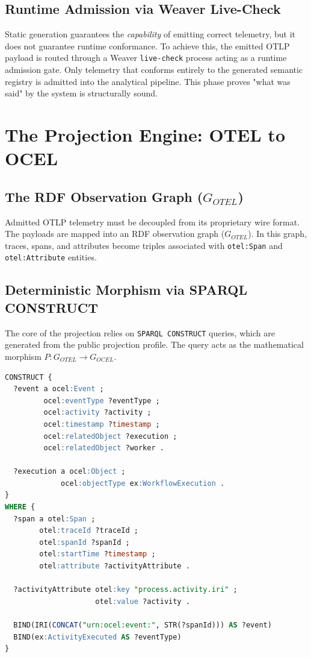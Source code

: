 \documentclass[12pt,a4paper,oneside]{book}
\begin{document}
\section{Runtime Admission via Weaver Live-Check}
Static generation guarantees the \textit{capability} of emitting correct telemetry, but it does not guarantee runtime conformance. To achieve this, the emitted OTLP payload is routed through a Weaver \texttt{live-check} process acting as a runtime admission gate. Only telemetry that conforms entirely to the generated semantic registry is admitted into the analytical pipeline. This phase proves "what was said" by the system is structurally sound.

\chapter{The Projection Engine: OTEL to OCEL}

\section{The RDF Observation Graph ($G_{OTEL}$)}
Admitted OTLP telemetry must be decoupled from its proprietary wire format. The payloads are mapped into an RDF observation graph ($G_{OTEL}$). In this graph, traces, spans, and attributes become triples associated with \texttt{otel:Span} and \texttt{otel:Attribute} entities.

\section{Deterministic Morphism via SPARQL CONSTRUCT}
The core of the projection relies on \texttt{SPARQL CONSTRUCT} queries, which are generated from the public projection profile. The query acts as the mathematical morphism $P: G_{OTEL} \to G_{OCEL}$.

\begin{lstlisting}[language=SQL, caption=Conceptual SPARQL Projection Query]
CONSTRUCT {
  ?event a ocel:Event ;
         ocel:eventType ?eventType ;
         ocel:activity ?activity ;
         ocel:timestamp ?timestamp ;
         ocel:relatedObject ?execution ;
         ocel:relatedObject ?worker .

  ?execution a ocel:Object ;
             ocel:objectType ex:WorkflowExecution .
}
WHERE {
  ?span a otel:Span ;
        otel:traceId ?traceId ;
        otel:spanId ?spanId ;
        otel:startTime ?timestamp ;
        otel:attribute ?activityAttribute .

  ?activityAttribute otel:key "process.activity.iri" ;
                     otel:value ?activity .

  BIND(IRI(CONCAT("urn:ocel:event:", STR(?spanId))) AS ?event)
  BIND(ex:ActivityExecuted AS ?eventType)
}
\end{lstlisting}
\end{document}
